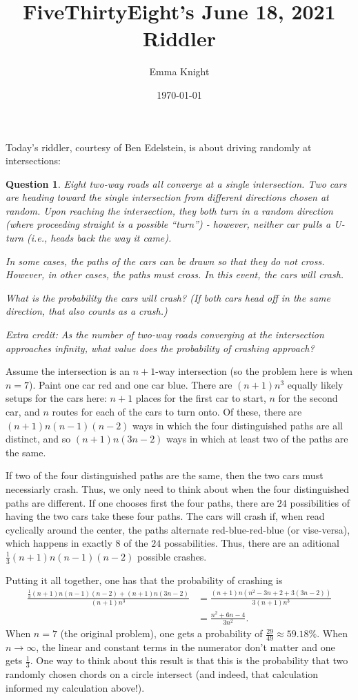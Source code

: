 \documentclass[11pt]{article}
\title{FiveThirtyEight's June 18, 2021 Riddler}
\author{Emma Knight}
\date{\today}
\newtheorem{question}[theorem]{Question}
\theoremstyle{definition}
\begin{document}
\maketitle
Today's riddler, courtesy of Ben Edelstein, is about driving randomly at intersections:
\begin{question}
Eight two-way roads all converge at a single intersection. Two cars are heading toward the single intersection from different directions chosen at random. Upon reaching the intersection, they both turn in a random direction (where proceeding straight is a possible ``turn'') - however, neither car pulls a U-turn (i.e., heads back the way it came).

In some cases, the paths of the cars can be drawn so that they do not cross.  However, in other cases, the paths \emph{must} cross.  In this event, the cars will crash.

What is the probability the cars will crash? (If both cars head off in the same direction, that also counts as a crash.)

\emph{Extra credit}: As the number of two-way roads converging at the intersection approaches infinity, what value does the probability of crashing approach?
\end{question}
Assume the intersection is an $n+1$-way intersection (so the problem here is when $n = 7$).  Paint one car red and one car blue.  There are $(n+1)n^3$ equally likely setups for the cars here: $n+1$ places for the first car to start, $n$ for the second car, and $n$ routes for each of the cars to turn onto.  Of these, there are $(n+1)n(n-1)(n-2)$ ways in which the four distinguished paths are all distinct, and so $(n+1)n(3n-2)$ ways in which at least two of the paths are the same.

If two of the four distinguished paths are the same, then the two cars must necessiarly crash.  Thus, we only need to think about when the four distinguished paths are different.  If one chooses first the four paths, there are $24$ possibilities of having the two cars take these four paths.  The cars will crash if, when read cyclically around the center, the paths alternate red-blue-red-blue (or vise-versa), which happens in exactly $8$ of the $24$ possabilities.  Thus, there are an aditional $\frac{1}{3}(n+1)n(n-1)(n-2)$ possible crashes.

Putting it all together, one has that the probability of crashing is
\begin{align*}
\frac{\frac{1}{3}(n+1)n(n-1)(n-2) + (n+1)n(3n-2)}{(n+1)n^3} & = \frac{(n+1)n(n^2 - 3n + 2 + 3(3n-2))}{3(n+1)n^3} \\
& = \frac{n^2 + 6n - 4}{3n^2}.
\end{align*}
When $n = 7$ (the original problem), one gets a probability of $\frac{29}{49} \approx 59.18\%$.  When $n \rightarrow \infty$, the linear and constant terms in the numerator don't matter and one gets $\frac{1}{3}$.  One way to think about this result is that this is the probability that two randomly chosen chords on a circle intersect (and indeed, that calculation informed my calculation above!).
\end{document}

